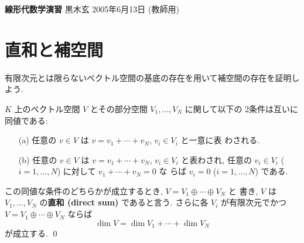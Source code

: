 \documentclass[12pt,twoside]{jarticle}
\newcommand\commentout[1]{#1}
\newcommand\commentout[1]{}
\begin{document}

%
%



\noindent
{\Large\bf 線形代数学演習}
\hfill
{\large 黒木玄}
\qquad
2005年6月13日
\commentout{\quad (教師用)}


\tableofcontents


\section{直和と補空間}

有限次元とは限らないベクトル空間の基底の存在を用いて補空間の存在を証明しよう.

\begin{question}[直和, 5点]
  $K$ 上のベクトル空間 $V$ とその部分空間 $V_1,\ldots,V_N$ に関して以下の
  2条件は互いに同値である:
  \begin{enumerate}
  \item[(a)] 任意の $v\in V$ は $v=v_1+\cdots+v_N$, $v_i\in V_i$ と一意に表
    わされる.
  \item[(b)] 任意の $v\in V$ は $v=v_1+\cdots+v_N$, $v_i\in V_i$ と表わされ,
    任意の $v_i\in V_i$ ($i=1,\ldots,N$) に対して $v_1+\cdots+v_N=0$ な
    らば $v_i=0$ ($i=1,\ldots,N$) である.
  \end{enumerate}
  この同値な条件のどちらかが成立するとき, $V=V_1\oplus\cdots\oplus V_N$ と
  書き, $V$ は $V_1,\ldots,V_N$ の{\bf 直和 (direct sum)} であると言う.
  さらに各 $V_i$ が有限次元でかつ $V=V_1\oplus\cdots\oplus V_N$ ならば
  \begin{equation*}
    \dim V = \dim V_1 + \cdots + \dim V_N
  \end{equation*}
  が成立する. \qed
\end{question}
\end{document}
